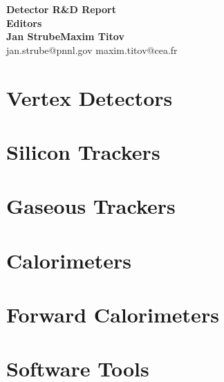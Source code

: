 \documentclass[10pt,final]{report}
\begin{document}
\begin{titlepage}
    \begin{center}
        \textbf{\huge Detector R\&D Report}\\
        \vspace{1.5cm}
        \textbf{\Large Editors}\\
        \textbf{\Large Jan Strube\qquad Maxim Titov} \\
        jan.strube@pnnl.gov \qquad ‎maxim.titov@cea.fr \\
    \end{center}
\end{titlepage}
\tableofcontents
\listoftodos
\chapter{Vertex Detectors}








\newpage


\newpage
\chapter{Silicon Trackers}



\chapter{Gaseous Trackers}


\chapter{Calorimeters}











\chapter{Forward Calorimeters}


\chapter{Software Tools}




\printbibliography
\end{document}

